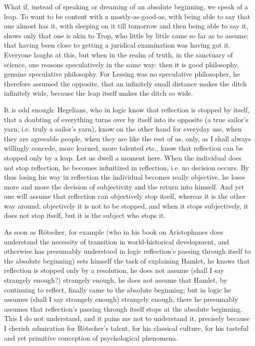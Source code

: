 \documentclass[12pt,a4paper,openany]{book}
\newcommand{\opage}[1]{\marginnote{\footnotesize\textit{[#1]}}}
\begin{document}
What if, instead of speaking or dreaming of an absolute beginning, we speak of a leap.
To want to be content with a mostly-as-good-as, with being able to say that one almost
has it, with sleeping on it till tomorrow and then being able to say it, shows only
that one is akin to Trop, who little by little came so far as to assume: that having
been close to getting a juridical examination was having got it. Everyone laughs at
this, but when in the realm of truth, in the sanctuary of science, one reasons
speculatively in the same way: then it is good philosophy, genuine speculative
philosophy. For Lessing was no speculative philosopher, he therefore assumed the
opposite, that an infinitely small distance makes the ditch infinitely wide, because
the leap itself makes the ditch so wide.

It is odd enough: Hegelians, who in logic know that reflection is stopped by itself,
that a doubting of everything turns over by itself into its opposite (a true
\setcounter{footnote}{0}%
\opage{177}sailor's yarn, i.e. truly a sailor's yarn), know on the other hand for everyday use, when
they are agreeable people, when they are like the rest of us, only, as I shall always
willingly concede, more learned, more talented etc., know that reflection can be
stopped only by a leap. Let us dwell a moment here. When the individual does not stop
reflection, he becomes infinitized in reflection, i.e. no decision occurs. By thus
losing his way in reflection the individual becomes really objective, he loses more
and more the decision of subjectivity and the return into himself. And yet one will
assume that reflection can objectively stop itself, whereas it is the other way
around; objectively it is not to be stopped, and when it stops subjectively, it does
not stop itself, but it is the subject who stops it.

As soon as Rötscher, for example (who in his book on Aristophanes does understand the
necessity of transition in world-historical development, and otherwise has presumably
understood in logic reflection's passing through itself to the absolute beginning)
sets himself the task of explaining Hamlet, he knows that reflection is stopped only
by a resolution, he does not assume (shall I say strangely enough?) strangely enough,
he does not assume that Hamlet, by continuing to reflect, finally came to the
absolute beginning; but in logic he assumes (shall I say strangely enough) strangely
enough, there he presumably assumes that reflection's passing through itself stops at
the absolute beginning. This I do not understand, and it pains me not to understand
it, precisely because I cherish admiration for Rötscher's talent, for his classical
culture, for his tasteful and yet primitive conception of psychological phenomena.
\end{document}
